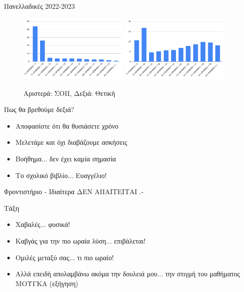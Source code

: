 \documentclass{presentation}
\begin{document}
\begin{frame}{Πανελλαδικές 2022-2023}
      \begin{figure}
            \centering
            \includegraphics[width=0.48\textwidth]{"images/panelladikes22sop.png"}
            \includegraphics[width=0.48\textwidth]{"images/panelladikes22thet.png"}
            \caption{Αριστερά: ΣΟΠ, Δεξιά: Θετική}
      \end{figure}
\end{frame}

\begin{frame}{Πως θα βρεθούμε δεξιά?}
      \begin{itemize}
            \item Αποφασίστε ότι θα θυσιάσετε χρόνο \pause
            \item Μελετάμε και όχι διαβάζουμε ασκήσεις \pause
            \item Βοήθημα... δεν έχει καμία σημασία \pause
            \item Το σχολικό βιβλίο... Ευαγγέλιο!
      \end{itemize}
\end{frame}

\begin{frame}{Φροντιστήριο - Ιδιαίτερα}
      \centering
      ΔΕΝ ΑΠΑΙΤΕΙΤΑΙ .-

\end{frame}

\begin{frame}{Τάξη}
      \begin{itemize}
            \item Χαβαλές... φυσικά! \pause
            \item Καβγάς για την πιο ωραία λύση... επιβάλεται! \pause
            \item Ομιλές μεταξύ σας... τι πιο ωραίο! \pause
            \item Αλλά επειδή απολαμβάνω ακόμα την δουλειά μου... την στιγμή του μαθήματος ΜΟΥΓΚΑ (εξήγηση)
      \end{itemize}
\end{frame}
\end{document}

